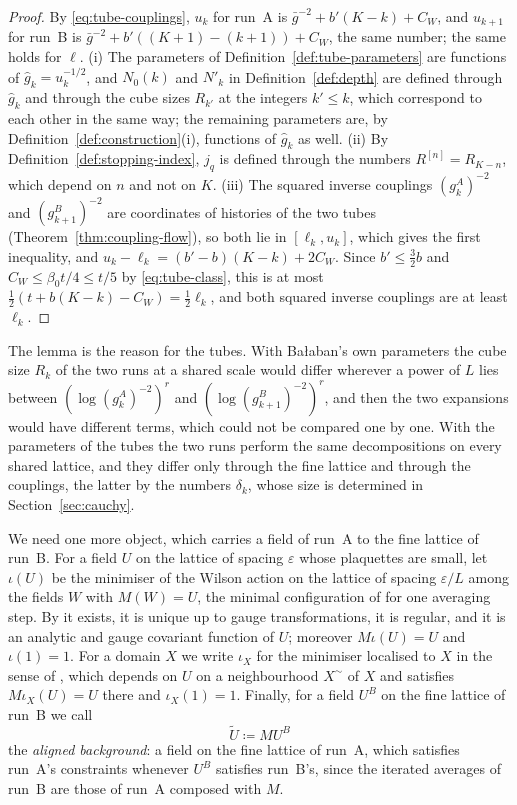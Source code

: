 \documentclass[11pt]{preprint}
\numberwithin{equation}{section}
\theoremstyle{definition}
\theoremstyle{remark}
\theoremstyle{plain}
\begin{document}
\begin{proof}
By \eqref{eq:tube-couplings}, $u_k$ for run~A is $\bar g^{-2} + b'(K - k) + C_W$, and $u_{k+1}$ for run~B is $\bar g^{-2} + b'((K + 1) - (k + 1)) + C_W$, the same number; the same holds for $\ell$. (i) The parameters of Definition~\ref{def:tube-parameters} are functions of $\hat g_k = u_k^{-1/2}$, and $N_0(k)$ and $N'_k$ in Definition~\ref{def:depth} are defined through $\hat g_k$ and through the cube sizes $R_{k'}$ at the integers $k' \leq k$, which correspond to each other in the same way; the remaining parameters are, by Definition~\ref{def:construction}(i), functions of $\hat g_k$ as well. (ii) By Definition~\ref{def:stopping-index}, $j_q$ is defined through the numbers $R^{[n]} = R_{K-n}$, which depend on $n$ and not on $K$. (iii) The squared inverse couplings $(g^A_k)^{-2}$ and $(g^B_{k+1})^{-2}$ are coordinates of histories of the two tubes (Theorem~\ref{thm:coupling-flow}), so both lie in $[\ell_k, u_k]$, which gives the first inequality, and $u_k - \ell_k = (b' - b)(K - k) + 2C_W$. Since $b' \leq \frac32b$ and $C_W \leq \beta_0t/4 \leq t/5$ by \eqref{eq:tube-class}, this is at most $\frac12(t + b(K - k) - C_W) = \frac12\ell_k$, and both squared inverse couplings are at least $\ell_k$.
\end{proof}

The lemma is the reason for the tubes. With Ba{\l}aban's own parameters the cube size $R_k$ of the two runs at a shared scale would differ wherever a power of $L$ lies between $(\log(g^A_k)^{-2})^r$ and $(\log(g^B_{k+1})^{-2})^r$, and then the two expansions would have different terms, which could not be compared one by one. With the parameters of the tubes the two runs perform the same decompositions on every shared lattice, and they differ only through the fine lattice and through the couplings, the latter by the numbers $\delta_k$, whose size is determined in Section~\ref{sec:cauchy}.

We need one more object, which carries a field of run~A to the fine lattice of run~B. For a field $U$ on the lattice of spacing $\varepsilon$ whose plaquettes are small, let $\iota(U)$ be the minimiser of the Wilson action on the lattice of spacing $\varepsilon/L$ among the fields $W$ with $M(W) = U$, the minimal configuration of \cite[(2.11), (2.12), p.~256]{BalabanCRE} for one averaging step. By \cite[Theorem~1, p.~279]{BalabanVAR} it exists, it is unique up to gauge transformations, it is regular, and it is an analytic and gauge covariant function of $U$; moreover $M\iota(U) = U$ and $\iota(1) = 1$. For a domain $X$ we write $\iota_X$ for the minimiser localised to $X$ in the sense of \cite[(2.14)--(2.16), p.~257]{BalabanCRE}, which depends on $U$ on a neighbourhood $X^\sim$ of $X$ and satisfies $M\iota_X(U) = U$ there and $\iota_X(1) = 1$. Finally, for a field $U^B$ on the fine lattice of run~B we call
\begin{equation}\label{eq:aligned-background}
    \tilde U \coloneqq MU^B
\end{equation}
the \emph{aligned background}: a field on the fine lattice of run~A, which satisfies run~A's constraints whenever $U^B$ satisfies run~B's, since the iterated averages of run~B are those of run~A composed with $M$.
\end{document}

